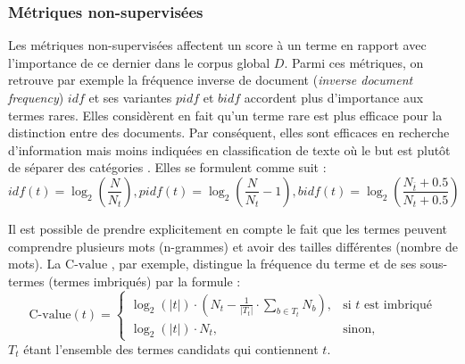 
\subsubsection{Métriques non-supervisées}
Les métriques non-supervisées affectent un score à un terme en rapport avec l'importance de ce dernier dans le corpus global $D$. Parmi ces métriques, on retrouve par exemple la fréquence inverse de document (\textit{inverse document frequency}) $idf$ \citep{sparck1972idf} et ses variantes $pidf$ \citep{wu1981pidf}  et $bidf$ \citep{jones2000bm25idf} accordent plus d'importance aux termes rares. Elles considèrent en fait qu'un terme rare est plus efficace pour la distinction entre des documents. Par conséquent, elles sont efficaces en recherche d'information mais moins indiquées en classification de texte où le but est plutôt de séparer des catégories \citep{wu2017balancingtermweight}. Elles se formulent comme suit :
\[idf(t) = \log_2\left(\frac{N}{N_t}\right), pidf(t) = \log_2\left(\frac{N}{N_t} - 1\right), bidf(t) = \log_2\left(\frac{N_{\overline{t}} + 0.5}{N_t + 0.5}\right)\]

Il est possible de prendre explicitement en compte le fait que les termes peuvent comprendre plusieurs mots (n-grammes) et avoir des tailles différentes (nombre de mots). La $\text{C-value}$ \citep{frantzi2000CValueNCValue}, par exemple, distingue la fréquence du terme et de ses sous-termes (termes imbriqués) par la formule : %
\[\text{C-value}(t) = \begin{cases} \log_2(\vert t \vert) \cdot (N_t - \frac{1}{\vert T_t \vert} \cdot \sum\limits_{b \in T_t} N_b), & \mbox{si } t \mbox{ est imbriqué} \\ \log_2(\vert t \vert) \cdot N_t, & \mbox{sinon,} \end{cases}\]
$T_t$ étant l'ensemble des termes candidats qui contiennent $t$.


